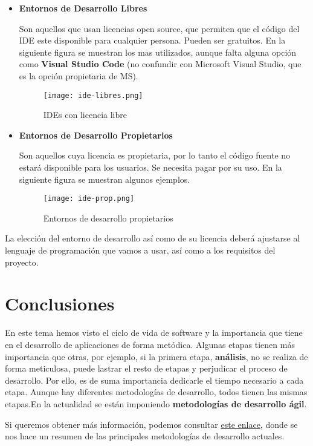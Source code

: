 \begin{itemize}
    \item \textbf{Entornos de Desarrollo Libres}

    Son aquellos que usan licencias open source, que permiten que el código del IDE este disponible para cualquier persona. Pueden ser gratuitos. En la siguiente figura se muestran los mas utilizados, aunque falta alguna opción como \textbf{Visual Studio Code} (no confundir con Microsoft Visual Studio, que es la opción propietaria de MS).

    \begin{figure}[ht]
        \centering
        \texttt{[image: ide-libres.png]}
        \caption{IDEs con licencia libre}
    \end{figure}

    \item \textbf{Entornos de Desarrollo Propietarios}

    Son aquellos cuya licencia es propietaria, por lo tanto el código fuente no estará disponible para los usuarios. Se necesita pagar por su uso. En la siguiente figura se muestran algunos ejemplos.

    \begin{figure}[ht]
        \centering
        \texttt{[image: ide-prop.png]}
        \caption{Entornos de desarrollo propietarios}
    \end{figure}
\end{itemize}

La elección del entorno de desarrollo así como de su licencia deberá ajustarse al lenguaje de programación que vamos a usar, así como a los requisitos del proyecto.

\section{Conclusiones}
En este tema hemos visto el ciclo de vida de software y la importancia que tiene en el desarrollo de aplicaciones de forma metódica. Algunas etapas tienen más importancia que otras, por ejemplo, si la primera etapa, \textbf{análisis}, no se realiza de forma meticulosa, puede lastrar el resto de etapas y perjudicar el proceso de desarrollo. Por ello, es de suma importancia dedicarle el tiempo necesario a cada etapa. Aunque hay diferentes metodologías de desarrollo, todos tienen las mismas etapas.En la actualidad se están imponiendo \textbf{metodologías de desarrollo ágil}.

Si queremos obtener más información, podemos consultar \href{https://www.itmplatform.com/es/blog/ciclos-de-vida-clasico-iterativo-y-agil/}{este enlace}, donde se nos hace un resumen de las principales metodologías de desarrollo actuales.


